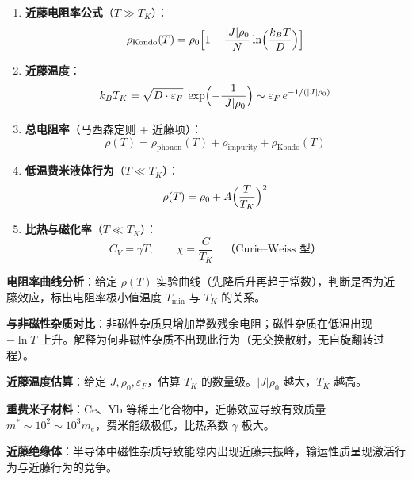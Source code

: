 \begin{formulabox}[核心公式]
\begin{enumerate}[label=\textbf{(\arabic*)}]
    \item \textbf{近藤电阻率公式}（$T\gg T_K$）：
    \[
    \rho_{\text{Kondo}}(T)=\rho_0\Bigl[1-\frac{|J|\rho_0}{N}\ln\Bigl(\frac{k_BT}{D}\Bigr)\Bigr]
    \]

    \item \textbf{近藤温度}：
    \[
    k_BT_K=\sqrt{D\cdot\varepsilon_F}\;\exp\Bigl(-\frac{1}{|J|\rho_0}\Bigr)
    \sim\varepsilon_F\,e^{-1/(|J|\rho_0)}
    \]

    \item \textbf{总电阻率}（马西森定则 + 近藤项）：
    \[
    \rho(T)=\rho_{\text{phonon}}(T)+\rho_{\text{impurity}}+\rho_{\text{Kondo}}(T)
    \]

    \item \textbf{低温费米液体行为}（$T\ll T_K$）：
    \[
    \rho(T)=\rho_0+A\Bigl(\frac{T}{T_K}\Bigr)^2
    \]

    \item \textbf{比热与磁化率}（$T\ll T_K$）：
    \[
    C_V=\gamma T,\qquad \chi=\frac{C}{T_K}\quad\text{（Curie--Weiss 型）}
    \]
\end{enumerate}
\end{formulabox}

\begin{drillbox}[训练点与考法变体]
 \textbf{电阻率曲线分析}：给定 $\rho(T)$ 实验曲线（先降后升再趋于常数），判断是否为近藤效应，标出电阻率极小值温度 $T_{\min}$ 与 $T_K$ 的关系。

 \textbf{与非磁性杂质对比}：非磁性杂质只增加常数残余电阻；磁性杂质在低温出现 $-\ln T$ 上升。解释为何非磁性杂质不出现此行为（无交换散射，无自旋翻转过程）。

 \textbf{近藤温度估算}：给定 $J, \rho_0, \varepsilon_F$，估算 $T_K$ 的数量级。$|J|\rho_0$ 越大，$T_K$ 越高。

 \textbf{重费米子材料}：Ce、Yb 等稀土化合物中，近藤效应导致有效质量 $m^*\sim 10^2\sim10^3 m_e$，费米能级极低，比热系数 $\gamma$ 极大。

 \textbf{近藤绝缘体}：半导体中磁性杂质导致能隙内出现近藤共振峰，输运性质呈现激活行为与近藤行为的竞争。
\end{drillbox}

